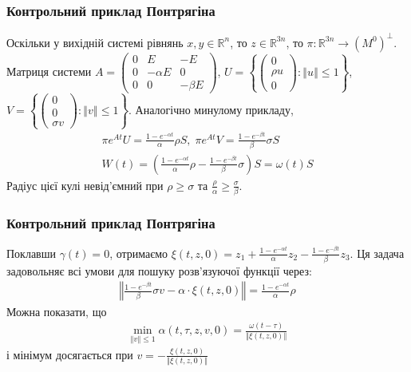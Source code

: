 \documentclass[10pt,pdf,aspectratio=169]{beamer}
\newcommand{\R}{\mathbb{R}}
\renewcommand{\l}{\left}
\renewcommand{\r}{\right}
\newcommand{\norm}[1]{\left\Vert #1 \right\Vert}
\begin{document}
    \begin{frame}
        \frametitle{Контрольний приклад Понтрягіна}
    
        Оскільки у вихідній системі рівнянь $x, y \in \R^n$, то $z \in \R^{3n}$,
        то $\pi : \R^{3n} \to (M^0)^\perp$. Матриця системи
        $A = \begin{pmatrix}
            0 & E & -E \\
            0 & -\alpha E & 0 \\
            0 & 0 & -\beta E
        \end{pmatrix}$,
        $
        U = \l\{ \begin{pmatrix}0 \\ \rho u \\ 0 \end{pmatrix} : \norm{u} \leq 1\r\}
        $,
        $
        V = \l\{ \begin{pmatrix}0 \\ 0 \\ \sigma v \end{pmatrix} : \norm{v} \leq 1\r\}
        $.
        Аналогічно минулому прикладу,
        \begin{gather*}
            \pi e^{At} U = \frac{1 - e^{-\alpha t}}{\alpha} \rho S, \;
            \pi e^{At} V = \frac{1 - e^{-\beta t}}{\beta} \sigma S \\
            W(t) = \l(\frac{1 - e^{-\alpha t}}{\alpha} \rho - \frac{1 - e^{-\beta t}}{\beta} \sigma\r) S = \omega(t) S
        \end{gather*}
        Радіус цієї кулі невід'ємний при $\rho \geq \sigma$ та $\frac{\rho}{\alpha} \geq \frac{\sigma}{\beta}$.
    
    \end{frame}
    \begin{frame}
        \frametitle{Контрольний приклад Понтрягіна}
    
        Поклавши $\gamma(t) = 0$, отримаємо
        $\xi(t, z, 0) = z_1 + \frac{1 - e^{-\alpha t}}{\alpha} z_2 - \frac{1 - e^{-\beta t}}{\beta}z_3$.
        Ця задача задовольняє всі умови для пошуку розв'язуючої функції через:
        \begin{gather*}
            \norm{\frac{1 - e^{-\beta t}}{\beta} \sigma v - \alpha \cdot \xi(t, z, 0)} = \frac{1 - e^{-\alpha t}}{\alpha} \rho
        \end{gather*}
        Можна показати, що 
        \begin{gather*}
            \underset{\norm{v}\leq 1}{\min}{\alpha(t, \tau, z, v, 0)} = \frac{\omega(t-\tau)}{\norm{\xi(t, z, 0)}}
        \end{gather*}
        і мінімум досягається при $v = -\frac{\xi(t, z, 0)}{\norm{\xi(t, z, 0)}}$
    
    \end{frame}
\end{document}
